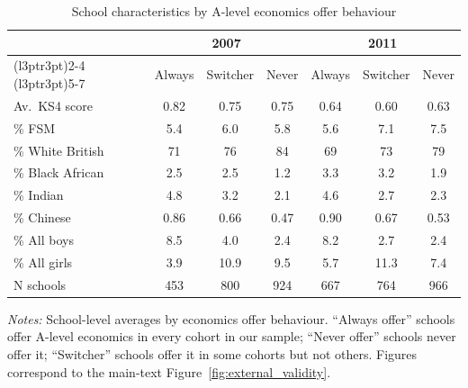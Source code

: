 \begin{table}[htbp]
\centering
\caption{School characteristics by A-level economics offer behaviour}
\label{tab:school_chars}
\begin{tabular}{l ccc ccc}
\toprule
                              & \multicolumn{3}{c}{2007}               & \multicolumn{3}{c}{2011}               \\
\cmidrule(l{3pt}r{3pt}){2-4} \cmidrule(l{3pt}r{3pt}){5-7}
                              & Always     & Switcher   & Never      & Always     & Switcher   & Never      \\
\midrule
Av.\ KS4 score               & 0.82       & 0.75       & 0.75       & 0.64       & 0.60       & 0.63       \\
\% FSM                        & 5.4        & 6.0        & 5.8        & 5.6        & 7.1        & 7.5       \\
\% White British              & 71         & 76         & 84         & 69         & 73         & 79         \\
\% Black African              & 2.5        & 2.5        & 1.2        & 3.3        & 3.2        & 1.9        \\
\% Indian                     & 4.8        & 3.2        & 2.1        & 4.6        & 2.7        & 2.3        \\
\% Chinese                    & 0.86       & 0.66       & 0.47       & 0.90       & 0.67       & 0.53       \\
\% All boys                   & 8.5        & 4.0        & 2.4        & 8.2        & 2.7        & 2.4        \\
\% All girls                  & 3.9        & 10.9        & 9.5        & 5.7        & 11.3        & 7.4        \\
\addlinespace
N schools                     & 453        & 800      & 924      & 667        & 764        & 966      \\
\bottomrule
\end{tabular}
\begin{minipage}{\textwidth}
\smallskip
\footnotesize
\textit{Notes:} School-level averages by economics offer behaviour. ``Always offer'' schools offer A-level economics in every cohort in our sample; ``Never offer'' schools never offer it; ``Switcher'' schools offer it in some cohorts but not others. Figures correspond to the main-text Figure~\ref{fig:external_validity}.
\end{minipage}
\end{table}
